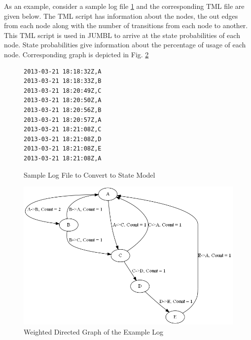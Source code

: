 As an example, consider a sample log file \ref{samplelogfile} and the corresponding TML file are given below. The TML script has information about the nodes, the out edges from each node along with the number of transitions from each node to another. This TML script is used in JUMBL to arrive at the state probabilities of each node. State probabilities give information about the percentage of usage of each node. Corresponding graph is depicted in Fig. \ref{op-profile-example}


\begin{figure}
\label{samplelogfile}
\hrulefill
\begin{verbatim}
2013-03-21 18:18:32Z,A
2013-03-21 18:18:33Z,B
2013-03-21 18:20:49Z,C
2013-03-21 18:20:50Z,A
2013-03-21 18:20:56Z,B
2013-03-21 18:20:57Z,A
2013-03-21 18:21:08Z,C
2013-03-21 18:21:08Z,D
2013-03-21 18:21:08Z,E
2013-03-21 18:21:08Z,A
\end{verbatim}
\hrulefill
\caption{Sample Log File to Convert to State Model}
\end{figure}

 
\begin{figure}[h]
  \centering
  \includegraphics[scale=.40]{../Graphics/op-profile-example.png}
  \caption{Weighted Directed Graph of the Example Log}\label{op-profile-example}
\end{figure}

